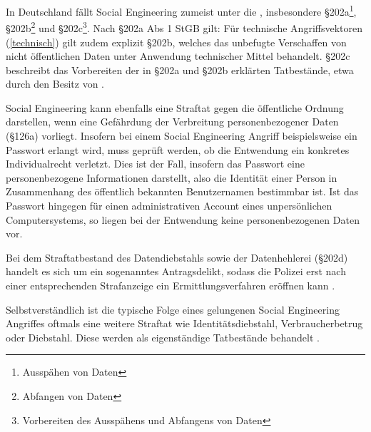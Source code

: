 In Deutschland fällt Social Engineering zumeist unter die , insbesondere §202a\footnote{Ausspähen von Daten}, §202b\footnote{Abfangen von Daten} und §202c\footnote{Vorbereiten des Ausspähens und Abfangens von Daten}.
Nach §202a Abs 1 StGB gilt:
Für technische Angriffsvektoren (\autoref{technisch}) gilt zudem explizit §202b, welches das unbefugte Verschaffen von nicht öffentlichen Daten unter Anwendung technischer Mittel behandelt.
§202c beschreibt das Vorbereiten der in §202a und §202b erklärten Tatbestände, etwa durch den Besitz von . 


Social Engineering kann ebenfalls eine Straftat gegen die öffentliche Ordnung darstellen, wenn eine Gefährdung der Verbreitung personenbezogener Daten (§126a) vorliegt.
Insofern bei einem Social Engineering Angriff beispielsweise ein Passwort erlangt wird, muss geprüft werden, ob die Entwendung ein konkretes Individualrecht verletzt.
Dies ist der Fall, insofern das Passwort eine personenbezogene Informationen darstellt, also die Identität einer Person in Zusammenhang des öffentlich bekannten Benutzernamen bestimmbar ist.
Ist das Passwort hingegen für einen administrativen Account eines unpersönlichen Computersystems, so liegen bei der Entwendung keine personenbezogenen Daten vor.

Bei dem Straftatbestand des Datendiebstahls sowie der Datenhehlerei (§202d) handelt es sich um ein sogenanntes Antragsdelikt, sodass die Polizei erst nach einer entsprechenden Strafanzeige ein Ermittlungsverfahren eröffnen kann .


Selbstverständlich ist die typische Folge eines gelungenen Social Engineering Angriffes oftmals eine weitere Straftat wie Identitätsdiebstahl, Verbraucherbetrug oder Diebstahl.
Diese werden als eigenständige Tatbestände behandelt .
